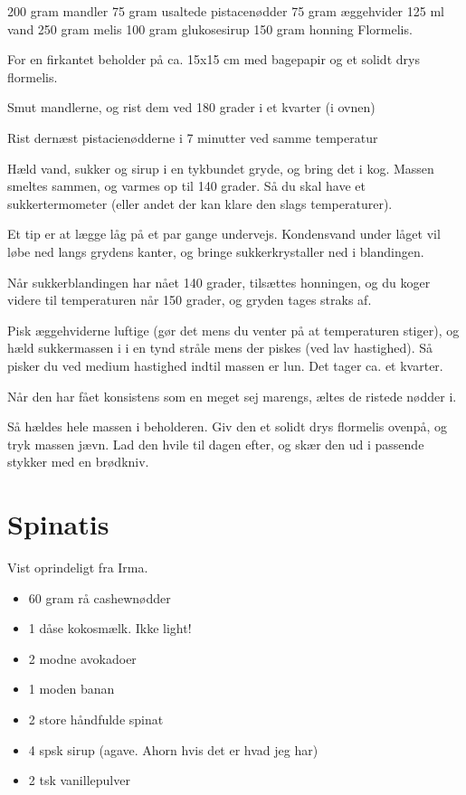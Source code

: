 \documentclass[
]{book}
\providecommand{\tightlist}{%
  \setlength{\itemsep}{0pt}\setlength{\parskip}{0pt}}
\begin{document}
200 gram mandler
75 gram usaltede pistacenødder
75 gram æggehvider
125 ml vand
250 gram melis
100 gram glukosesirup
150 gram honning
Flormelis.

For en firkantet beholder på ca. 15x15 cm med bagepapir og et solidt drys flormelis.

Smut mandlerne, og rist dem ved 180 grader i et kvarter (i ovnen)

Rist dernæst pistacienødderne i 7 minutter ved samme temperatur

Hæld vand, sukker og sirup i en tykbundet gryde, og bring det i kog. Massen smeltes sammen, og varmes op til 140 grader. Så du skal have et sukkertermometer (eller andet der kan klare den slags temperaturer).

Et tip er at lægge låg på et par gange undervejs. Kondensvand under låget vil løbe ned langs grydens kanter, og bringe sukkerkrystaller ned i blandingen.

Når sukkerblandingen har nået 140 grader, tilsættes honningen, og du koger videre til temperaturen når 150 grader, og gryden tages straks af.

Pisk æggehviderne luftige (gør det mens du venter på at temperaturen stiger), og hæld sukkermassen i i en tynd stråle mens der piskes (ved lav hastighed). Så pisker du ved medium hastighed indtil massen er lun. Det tager ca. et kvarter.

Når den har fået konsistens som en meget sej marengs, æltes de ristede nødder i.

Så hældes hele massen i beholderen. Giv den et solidt drys flormelis ovenpå, og tryk massen jævn. Lad den hvile til dagen efter, og skær den ud i passende stykker med en brødkniv.

\section{Spinatis}\label{spinatis}

Vist oprindeligt fra Irma.

\begin{itemize}
\tightlist
\item
  60 gram rå cashewnødder
\item
  1 dåse kokosmælk. Ikke light!
\item
  2 modne avokadoer
\item
  1 moden banan
\item
  2 store håndfulde spinat
\item
  4 spsk sirup (agave. Ahorn hvis det er hvad jeg har)
\item
  2 tsk vanillepulver
\end{itemize}
\end{document}

